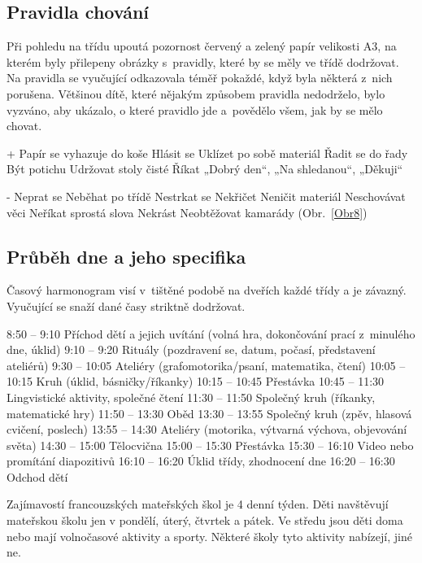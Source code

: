 		\subsection{Pravidla chování}
		\label{pravidlaChovani}
			Při pohledu na třídu upoutá pozornost červený a zelený papír velikosti A3, na kterém byly přilepeny obrázky s pravidly, které by se měly ve třídě dodržovat. Na pravidla se vyučující odkazovala téměř pokaždé, když byla některá z nich porušena. Většinou dítě, které nějakým způsobem pravidla nedodrželo, bylo vyzváno, aby ukázalo, o které pravidlo jde a povědělo všem, jak by se mělo chovat. 

+	Papír se vyhazuje do koše
	Hlásit se
	Uklízet po sobě materiál
	Řadit se do řady
	Být potichu
	Udržovat stoly čisté
Říkat „Dobrý den“, „Na shledanou“, „Děkuji“

- 	Neprat se
	Neběhat po třídě
	Nestrkat se
	Nekřičet
	Neničit materiál
	Neschovávat věci
	Neříkat sprostá slova
	Nekrást
	Neobtěžovat kamarády
(Obr.~\ref{Obr8})

		\subsection{Průběh dne a jeho specifika}

			Časový harmonogram visí v tištěné podobě na dveřích každé třídy a je závazný. Vyučující se snaží dané časy striktně dodržovat.

8:50 – 9:10 		Příchod dětí a jejich uvítání (volná hra, dokončování prací z minulého dne, úklid)
9:10 – 9:20		Rituály (pozdravení se, datum, počasí, představení ateliérů)
9:30 – 10:05		Ateliéry (grafomotorika/psaní, matematika, čtení)
10:05 – 10:15			Kruh (úklid, básničky/říkanky)
10:15 – 10:45			Přestávka
10:45 – 11:30			Lingvistické aktivity, společné čtení
11:30 – 11:50			Společný kruh (říkanky, matematické hry)
11:50 – 13:30			Oběd
13:30 – 13:55			Společný kruh (zpěv, hlasová cvičení, poslech)
13:55 – 14:30			Ateliéry (motorika, výtvarná výchova, objevování světa)
14:30 – 15:00			Tělocvična
15:00 – 15:30			Přestávka
15:30 – 16:10			Video nebo promítání diapozitivů
16:10 – 16:20			Úklid třídy, zhodnocení dne
16:20 – 16:30			Odchod dětí

			Zajímavostí francouzských mateřských škol je 4 denní týden. Děti navštěvují mateřskou školu jen v pondělí, úterý, čtvrtek a pátek. Ve středu jsou děti doma nebo mají volnočasové aktivity a sporty. Některé školy tyto aktivity nabízejí, jiné ne. 


